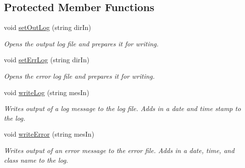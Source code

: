 \subsection*{Protected Member Functions}
\begin{DoxyCompactItemize}
\item 
void \hyperlink{classo_freq_core_a2912584189c4abd84498450b7c5908c2}{set\-Out\-Log} (string dir\-In)
\begin{DoxyCompactList}\small\item\em Opens the output log file and prepares it for writing. \end{DoxyCompactList}\item 
void \hyperlink{classo_freq_core_a8af56bbec3689f5d2252da1787a910e3}{set\-Err\-Log} (string dir\-In)
\begin{DoxyCompactList}\small\item\em Opens the error log file and prepares it for writing. \end{DoxyCompactList}\item 
void \hyperlink{classo_freq_core_a74a938eae7e51de72bc752ad83382a11}{write\-Log} (string mes\-In)
\begin{DoxyCompactList}\small\item\em Writes output of a log message to the log file. Adds in a date and time stamp to the log. \end{DoxyCompactList}\item 
void \hyperlink{classo_freq_core_a7272d265451eb63bb371f9b9c02f4883}{write\-Error} (string mes\-In)
\begin{DoxyCompactList}\small\item\em Writes output of an error message to the error file. Adds in a date, time, and class name to the log. \end{DoxyCompactList}\end{DoxyCompactItemize}
